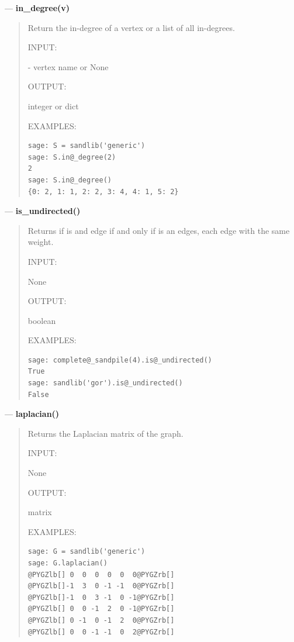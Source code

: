 \documentclass[letterpaper,10pt,english]{manual}
\begin{document}
---
\hypertarget{in-degree-v}{}
\textbf{in\_degree(v)}
\begin{quote}

Return the in-degree of a vertex or a list of all in-degrees.

INPUT:

 - vertex name or None

OUTPUT:

integer or dict

EXAMPLES:

\begin{Verbatim}[commandchars=@\[\]]
sage: S = sandlib('generic')
sage: S.in@_degree(2)
2
sage: S.in@_degree()
{0: 2, 1: 1, 2: 2, 3: 4, 4: 1, 5: 2}
\end{Verbatim}
\end{quote}

---
\hypertarget{is-undirected}{}
\textbf{is\_undirected()}
\begin{quote}

Returns  if  is and edge if and only if  is an
edges, each edge with the same weight.

INPUT:

None

OUTPUT:

boolean

EXAMPLES:

\begin{Verbatim}[commandchars=@\[\]]
sage: complete@_sandpile(4).is@_undirected()
True
sage: sandlib('gor').is@_undirected()
False
\end{Verbatim}
\end{quote}

---
\hypertarget{id7}{}
\textbf{laplacian()}
\begin{quote}

Returns the Laplacian matrix of the graph.

INPUT:

None

OUTPUT:

matrix

EXAMPLES:

\begin{Verbatim}[commandchars=@\[\]]
sage: G = sandlib('generic')
sage: G.laplacian()
@PYGZlb[] 0  0  0  0  0  0@PYGZrb[]
@PYGZlb[]-1  3  0 -1 -1  0@PYGZrb[]
@PYGZlb[]-1  0  3 -1  0 -1@PYGZrb[]
@PYGZlb[] 0  0 -1  2  0 -1@PYGZrb[]
@PYGZlb[] 0 -1  0 -1  2  0@PYGZrb[]
@PYGZlb[] 0  0 -1 -1  0  2@PYGZrb[]
\end{Verbatim}
\end{quote}
\end{document}
